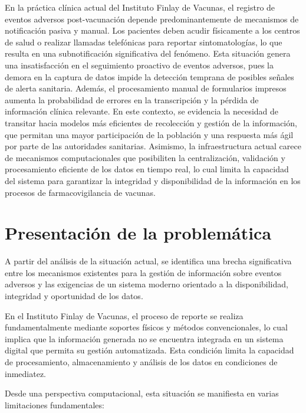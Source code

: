 En la práctica clínica actual del Instituto Finlay de Vacunas, el registro de eventos adversos post-vacunación depende predominantemente de mecanismos de notificación pasiva y manual. 
Los pacientes deben acudir físicamente a los centros de salud o realizar llamadas telefónicas para reportar sintomatologías, lo que resulta en una subnotificación significativa del fenómeno. 
Esta situación genera una insatisfacción en el seguimiento proactivo de eventos adversos, pues la demora en la captura de datos impide la detección temprana de posibles señales de alerta sanitaria. 
Además, el procesamiento manual de formularios impresos aumenta la probabilidad de errores en la transcripción y la pérdida de información clínica relevante.
En este contexto, se evidencia la necesidad de transitar hacia modelos más eficientes de recolección y gestión de la información, que permitan una mayor participación de la población y una respuesta más ágil por parte de las autoridades sanitarias. 
Asimismo, la infraestructura actual carece de mecanismos computacionales que posibiliten la centralización, validación y procesamiento eficiente de los datos en tiempo real, lo cual limita la capacidad del sistema para garantizar la integridad y disponibilidad de la información en los procesos de farmacovigilancia de vacunas.

\section{Presentación de la problemática}\label{section:presentacionProblema}

A partir del análisis de la situación actual, se identifica una brecha significativa entre los mecanismos existentes para la gestión de información sobre eventos adversos y las exigencias de un sistema moderno orientado a la disponibilidad, integridad y oportunidad de los datos.

En el Instituto Finlay de Vacunas, el proceso de reporte se realiza fundamentalmente mediante soportes físicos y métodos convencionales, lo cual implica que la información generada no se encuentra integrada en un sistema digital que permita su gestión automatizada. Esta condición limita la capacidad de procesamiento, almacenamiento y análisis de los datos en condiciones de inmediatez.

Desde una perspectiva computacional, esta situación se manifiesta en varias limitaciones fundamentales:

